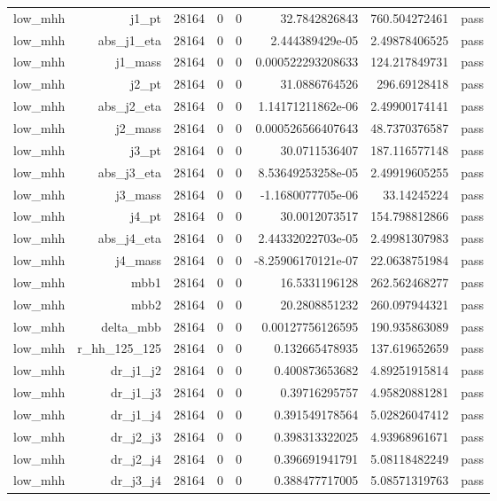 \begin{table}[htbp]
{\begin{tabular}{lrrrrrrr}
low\_mhh & j1\_pt & 28164 & 0 & 0 & 32.7842826843 & 760.504272461 & pass \\
low\_mhh & abs\_j1\_eta & 28164 & 0 & 0 & 2.444389429e-05 & 2.49878406525 & pass \\
low\_mhh & j1\_mass & 28164 & 0 & 0 & 0.000522293208633 & 124.217849731 & pass \\
low\_mhh & j2\_pt & 28164 & 0 & 0 & 31.0886764526 & 296.69128418 & pass \\
low\_mhh & abs\_j2\_eta & 28164 & 0 & 0 & 1.14171211862e-06 & 2.49900174141 & pass \\
low\_mhh & j2\_mass & 28164 & 0 & 0 & 0.000526566407643 & 48.7370376587 & pass \\
low\_mhh & j3\_pt & 28164 & 0 & 0 & 30.0711536407 & 187.116577148 & pass \\
low\_mhh & abs\_j3\_eta & 28164 & 0 & 0 & 8.53649253258e-05 & 2.49919605255 & pass \\
low\_mhh & j3\_mass & 28164 & 0 & 0 & -1.1680077705e-06 & 33.14245224 & pass \\
low\_mhh & j4\_pt & 28164 & 0 & 0 & 30.0012073517 & 154.798812866 & pass \\
low\_mhh & abs\_j4\_eta & 28164 & 0 & 0 & 2.44332022703e-05 & 2.49981307983 & pass \\
low\_mhh & j4\_mass & 28164 & 0 & 0 & -8.25906170121e-07 & 22.0638751984 & pass \\
low\_mhh & mbb1 & 28164 & 0 & 0 & 16.5331196128 & 262.562468277 & pass \\
low\_mhh & mbb2 & 28164 & 0 & 0 & 20.2808851232 & 260.097944321 & pass \\
low\_mhh & delta\_mbb & 28164 & 0 & 0 & 0.00127756126595 & 190.935863089 & pass \\
low\_mhh & r\_hh\_125\_125 & 28164 & 0 & 0 & 0.132665478935 & 137.619652659 & pass \\
low\_mhh & dr\_j1\_j2 & 28164 & 0 & 0 & 0.400873653682 & 4.89251915814 & pass \\
low\_mhh & dr\_j1\_j3 & 28164 & 0 & 0 & 0.39716295757 & 4.95820881281 & pass \\
low\_mhh & dr\_j1\_j4 & 28164 & 0 & 0 & 0.391549178564 & 5.02826047412 & pass \\
low\_mhh & dr\_j2\_j3 & 28164 & 0 & 0 & 0.398313322025 & 4.93968961671 & pass \\
low\_mhh & dr\_j2\_j4 & 28164 & 0 & 0 & 0.396691941791 & 5.08118482249 & pass \\
low\_mhh & dr\_j3\_j4 & 28164 & 0 & 0 & 0.388477717005 & 5.08571319763 & pass \\

\end{tabular}}
\end{table}
